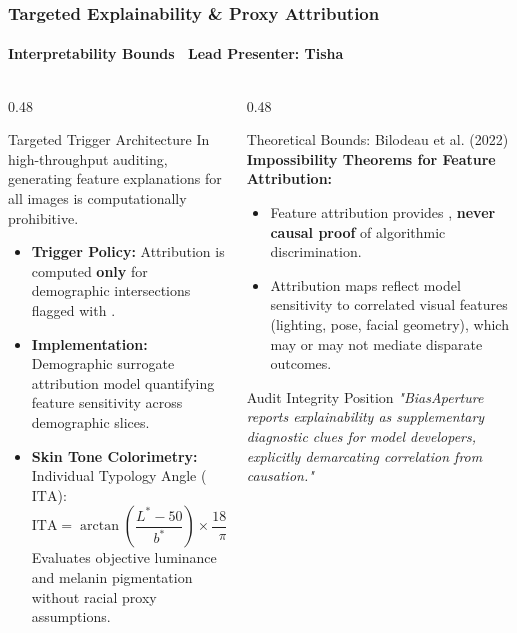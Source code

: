 \begin{frame}
  \frametitle{Targeted Explainability \& Proxy Attribution}
  \framesubtitle{Interpretability Bounds \textbar\ Lead Presenter: Tisha}

  \begin{columns}[T]
    \begin{column}{0.48\textwidth}
      \begin{card}{Targeted Trigger Architecture}
        \small In high-throughput auditing, generating feature explanations for all images is computationally prohibitive.
        \vspace{0.15cm}
        \begin{itemize}\footnotesize
          \item \textbf{Trigger Policy:} Attribution is computed \textbf{only} for demographic intersections flagged with .
          \item \textbf{Implementation:} Demographic surrogate attribution model quantifying feature sensitivity across demographic slices.
          \item \textbf{Skin Tone Colorimetry:} Individual Typology Angle ($\text{ITA}$):
          $$\text{ITA} = \arctan\left(\frac{L^* - 50}{b^*}\right) \times \frac{180}{\pi}$$
          Evaluates objective luminance and melanin pigmentation without racial proxy assumptions.
        \end{itemize}
      \end{card}
    \end{column}

    \begin{column}{0.48\textwidth}
      \begin{alertcard}{Theoretical Bounds: Bilodeau et al. (2022)}
        \small \textbf{Impossibility Theorems for Feature Attribution:}
        \vspace{0.1cm}
        \begin{itemize}\footnotesize
          \item Feature attribution provides , \textbf{never causal proof} of algorithmic discrimination.
          \item Attribution maps reflect model sensitivity to correlated visual features (lighting, pose, facial geometry), which may or may not mediate disparate outcomes.
        \end{itemize}
      \end{alertcard}

      \vspace{0.15cm}
      \begin{statcard}{Audit Integrity Position}
        \footnotesize \textit{"BiasAperture reports explainability as supplementary diagnostic clues for model developers, explicitly demarcating correlation from causation."}
      \end{statcard}
    \end{column}
  \end{columns}
\end{frame}
